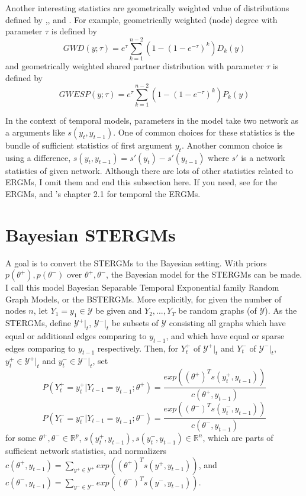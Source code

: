 \documentclass[aspectratio=169,ignorenonframetext,9pt]{beamer}
\theoremstyle{plain}
\theoremstyle{definition}
\begin{document}
Another interesting statistics are geometrically weighted value of distributions defined by
\cite{RN118},\cite{RN104},\cite{RN128} and \cite{RN103}.
For example, geometrically weighted (node) degree with parameter $\tau$ is defined by
\[GWD(y;\tau)=e^{\tau} \sum_{k=1}^{n-2} (1-(1-e^{-\tau})^k)D_k(y)\]
and geometrically weighted shared partner distribution with parameter $\tau$ is defined by
\[GWESP(y;\tau)=e^{\tau} \sum_{k=1}^{n-2} (1-(1-e^{-\tau})^k)P_k(y)\]


In the context of temporal models, parameters in the model take two network as a arguments like $s(y_t,y_{t-1})$.
One of common choices for these statistics is the bundle of sufficient statistics of first argument $y_t$.
Another common choice is using a difference, $s(y_t,y_{t-1})=s'(y_t)-s'(y_{t-1})$ where $s'$ is a network statistics of given network.
Although there are lots of other statistics related to ERGMs, I omit them and end this subsection here.
If you need, see \cite{RN107} for the ERGMs, and \cite{RN125}'s chapter 2.1 for temporal the ERGMs.


\section{Bayesian STERGMs}
A goal is to convert the STERGMs to the Bayesian setting.
With priors $p(\theta^+),p(\theta^-)$ over $\theta^+,\theta^-$,
the Bayesian model for the STERGMs can be made. I call this model Bayesian Separable Temporal Exponential family Random Graph Models,
or the BSTERGMs. More explicitly, for given the number of nodes $n$, let $Y_1=y_1 \in \mathcal{Y}$ be given and $Y_2,...,Y_T$ be random graphs (of $\mathcal{Y}$).
As the STERGMs, define $\mathcal{Y}^+|_t$, $\mathcal{Y}^-|_t$ be subsets of $\mathcal{Y}$ consisting all graphs which have equal or additional edges comparing to $y_{t-1}$,
and which have equal or sparse edges comparing to $y_{t-1}$ respectively.
Then, for $Y_t^+$ of $\mathcal{Y}^+|_t$ and $Y_t^-$ of $\mathcal{Y}^-|_t$, $y_t^+ \in \mathcal{Y}^+|_t$ and $y_t^- \in \mathcal{Y}^-|_t$, set
\[P(Y_t^+=y_t^+|Y_{t-1}=y_{t-1};\theta^+) = \frac{exp((\theta^+)^{T}s(y_t^+, y_{t-1}))}{c(\theta^+, y_{t-1})}\]
\[P(Y_t^-=y_t^-|Y_{t-1}=y_{t-1};\theta^-) = \frac{exp((\theta^-)^{T}s(y_t^-, y_{t-1}))}{c(\theta^-, y_{t-1})}\]
for some $\theta^+,\theta^-\in\mathbb{R}^p$, $s(y_t^+, y_{t-1}), s(y_t^-, y_{t-1})\in\mathbb{R}^n$, which are parts of sufficient network statistics,
and normalizers $c(\theta^+, y_{t-1})=\sum_{y^+\in\mathcal{Y}^+}exp((\theta^+)^{T}s(y^+, y_{t-1}))$, 
and $c(\theta^-, y_{t-1})=\sum_{y^-\in\mathcal{Y}^-}exp((\theta^-)^{T}s(y^-, y_{t-1}))$.
\end{document}
